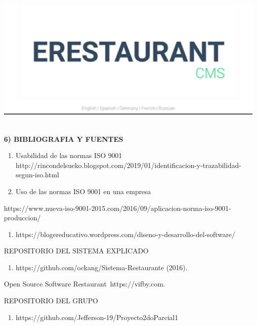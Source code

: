 \documentclass{article} %
\begin{document}
\noindent \includegraphics*[width=5.47in, height=2.76in, keepaspectratio=false]{image9}

\noindent 

\noindent 

\noindent 

\noindent 

\noindent 

\noindent 

\noindent 

\noindent 

\noindent \textbf{}

\noindent \textbf{6) BIBLIOGRAFIA Y FUENTES}

\begin{enumerate}
\item \textbf{ }Usabilidad de las normas ISO 9001 http://rincondelsueko.blogspot.com/2019/01/identificacion-y-trazabilidad-segun-iso.html\textbf{}

\item \textbf{ } Uso de las normas ISO 9001 en una empresa\textbf{}
\end{enumerate}

\noindent https://www.nueva-iso-9001-2015.com/2016/09/aplicacion-norma-iso-9001-produccion/

\begin{enumerate}
\item  https://blogereducativo.wordpress.com/diseno-y-desarrollo-del-software/
\end{enumerate}

\noindent REPOSITORIO DEL SISTEMA EXPLICADO 

\begin{enumerate}
\item  https://github.com/ockang/Sistema-Restaurante (2016).
\end{enumerate}

\noindent Open Source Software Restaurant~https://vifby.com.

\noindent REPOSITORIO DEL GRUPO 

\begin{enumerate}
\item  https://github.com/Jefferson-19/Proyecto2doParcial1
\end{enumerate}

\noindent 

\noindent 
\end{document}
